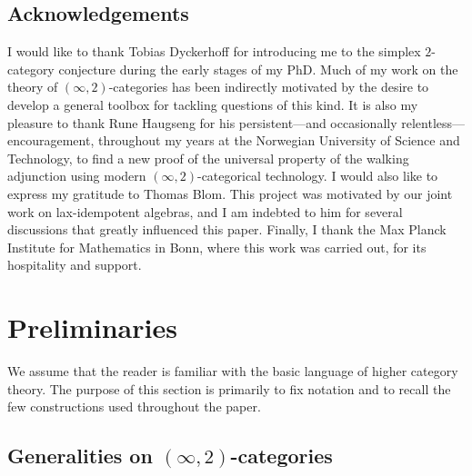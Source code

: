\documentclass[a4paper,reqno,twoside]{amsart}
\begin{document}
\subsection*{Acknowledgements}
I would like to thank Tobias Dyckerhoff for introducing me to the simplex $2$-category conjecture during the early stages of my PhD. Much of my work on the theory of $(\infty,2)$-categories has been indirectly motivated by the desire to develop a general toolbox for tackling questions of this kind. It is also my pleasure to thank Rune Haugseng for his persistent—and occasionally relentless—encouragement, throughout my years at the Norwegian University of Science and Technology, to find a new proof of the universal property of the walking adjunction using modern $(\infty,2)$-categorical technology. I would also like to express my gratitude to Thomas Blom. This project was motivated by our joint work on lax-idempotent algebras, and I am indebted to him for several discussions that greatly influenced this paper. Finally, I thank the Max Planck Institute for Mathematics in Bonn, where this work was carried out, for its hospitality and support.
\section{Preliminaries}
We assume that the reader is familiar with the basic language of higher category theory. The purpose of this section is primarily to fix notation and to recall the few constructions used throughout the paper.

\subsection{Generalities on $(\infty,2)$-categories}
\end{document}

